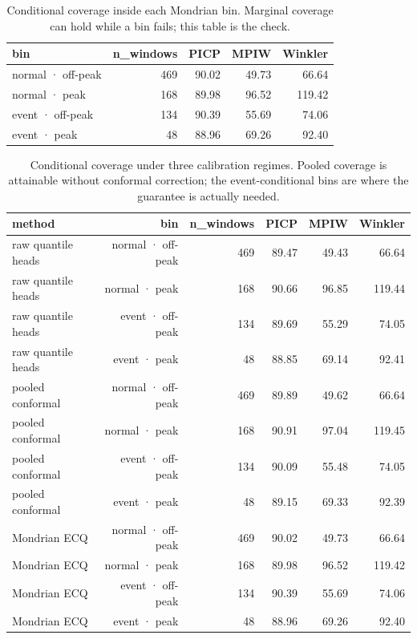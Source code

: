 \begin{table}[!t]
\caption{Conditional coverage inside each Mondrian bin. Marginal coverage can hold while a bin fails; this table is the check.}
\label{tab:conditional_coverage}
\centering
\footnotesize
\begin{tabular}{lrrrr}
\toprule
bin & n_windows & PICP & MPIW & Winkler \\
\midrule
normal · off-peak & 469 & 90.02 & 49.73 & 66.64 \\
normal · peak & 168 & 89.98 & 96.52 & 119.42 \\
event · off-peak & 134 & 90.39 & 55.69 & 74.06 \\
event · peak & 48 & 88.96 & 69.26 & 92.40 \\
\bottomrule
\end{tabular}
\end{table}

\begin{table}[!t]
\caption{Conditional coverage under three calibration regimes. Pooled coverage is attainable without conformal correction; the event-conditional bins are where the guarantee is actually needed.}
\label{tab:decisive}
\centering
\footnotesize
\begin{tabular}{lrrrrr}
\toprule
method & bin & n_windows & PICP & MPIW & Winkler \\
\midrule
raw quantile heads & normal · off-peak & 469 & 89.47 & 49.43 & 66.64 \\
raw quantile heads & normal · peak & 168 & 90.66 & 96.85 & 119.44 \\
raw quantile heads & event · off-peak & 134 & 89.69 & 55.29 & 74.05 \\
raw quantile heads & event · peak & 48 & 88.85 & 69.14 & 92.41 \\
pooled conformal & normal · off-peak & 469 & 89.89 & 49.62 & 66.64 \\
pooled conformal & normal · peak & 168 & 90.91 & 97.04 & 119.45 \\
pooled conformal & event · off-peak & 134 & 90.09 & 55.48 & 74.05 \\
pooled conformal & event · peak & 48 & 89.15 & 69.33 & 92.39 \\
Mondrian ECQ & normal · off-peak & 469 & 90.02 & 49.73 & 66.64 \\
Mondrian ECQ & normal · peak & 168 & 89.98 & 96.52 & 119.42 \\
Mondrian ECQ & event · off-peak & 134 & 90.39 & 55.69 & 74.06 \\
Mondrian ECQ & event · peak & 48 & 88.96 & 69.26 & 92.40 \\
\bottomrule
\end{tabular}
\end{table}

